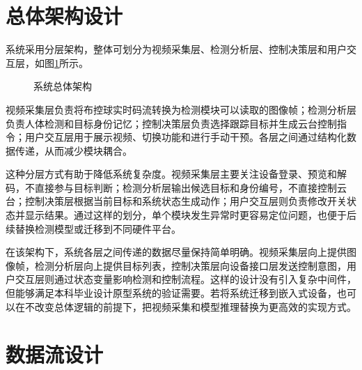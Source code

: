 \section{总体架构设计}

系统采用分层架构，整体可划分为视频采集层、检测分析层、控制决策层和用户交互层，如图\ref{fig:system-architecture}所示。

\begin{figure}[H]
    \centering
    \caption{系统总体架构}
    \label{fig:system-architecture}
\end{figure}

视频采集层负责将布控球实时码流转换为检测模块可以读取的图像帧；检测分析层负责人体检测和目标身份记忆；控制决策层负责选择跟踪目标并生成云台控制指令；用户交互层用于展示视频、切换功能和进行手动干预。各层之间通过结构化数据传递，从而减少模块耦合。

这种分层方式有助于降低系统复杂度。视频采集层主要关注设备登录、预览和解码，不直接参与目标判断；检测分析层输出候选目标和身份编号，不直接控制云台；控制决策层根据当前目标和系统状态生成动作；用户交互层则负责修改开关状态并显示结果。通过这样的划分，单个模块发生异常时更容易定位问题，也便于后续替换检测模型或迁移到不同硬件平台。

在该架构下，系统各层之间传递的数据尽量保持简单明确。视频采集层向上提供图像帧，检测分析层向上提供目标列表，控制决策层向设备接口层发送控制意图，用户交互层则通过状态变量影响检测和控制流程。这样的设计没有引入复杂中间件，但能够满足本科毕业设计原型系统的验证需要。若将系统迁移到嵌入式设备，也可以在不改变总体逻辑的前提下，把视频采集和模型推理替换为更高效的实现方式。

\section{数据流设计}

